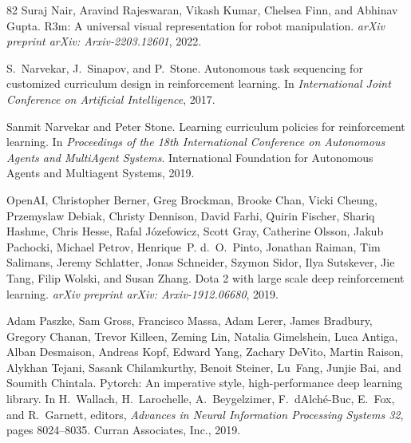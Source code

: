 \documentclass{article}
\begin{document}
\begin{thebibliography}{82}
Suraj Nair, Aravind Rajeswaran, Vikash Kumar, Chelsea Finn, and Abhinav Gupta.
\newblock R3m: A universal visual representation for robot manipulation.
\newblock \emph{arXiv preprint arXiv: Arxiv-2203.12601}, 2022.

S.~Narvekar, J.~Sinapov, and P.~Stone.
\newblock Autonomous task sequencing for customized curriculum design in reinforcement learning.
\newblock In \emph{International Joint Conference on Artificial Intelligence}, 2017.

Sanmit Narvekar and Peter Stone.
\newblock Learning curriculum policies for reinforcement learning.
\newblock In \emph{Proceedings of the 18th International Conference on Autonomous Agents and MultiAgent Systems}. International Foundation for Autonomous Agents and Multiagent Systems, 2019.

OpenAI, Christopher Berner, Greg Brockman, Brooke Chan, Vicki Cheung, Przemyslaw Debiak, Christy Dennison, David Farhi, Quirin Fischer, Shariq Hashme, Chris Hesse, Rafal Józefowicz, Scott Gray, Catherine Olsson, Jakub Pachocki, Michael Petrov, Henrique~P. d.~O.~Pinto, Jonathan Raiman, Tim Salimans, Jeremy Schlatter, Jonas Schneider, Szymon Sidor, Ilya Sutskever, Jie Tang, Filip Wolski, and Susan Zhang.
\newblock Dota 2 with large scale deep reinforcement learning.
\newblock \emph{arXiv preprint arXiv: Arxiv-1912.06680}, 2019.

Adam Paszke, Sam Gross, Francisco Massa, Adam Lerer, James Bradbury, Gregory Chanan, Trevor Killeen, Zeming Lin, Natalia Gimelshein, Luca Antiga, Alban Desmaison, Andreas Kopf, Edward Yang, Zachary DeVito, Martin Raison, Alykhan Tejani, Sasank Chilamkurthy, Benoit Steiner, Lu~Fang, Junjie Bai, and Soumith Chintala.
\newblock Pytorch: An imperative style, high-performance deep learning library.
\newblock In H.~Wallach, H.~Larochelle, A.~Beygelzimer, F.~d\textquotesingle Alch\'{e}-Buc, E.~Fox, and R.~Garnett, editors, \emph{Advances in Neural Information Processing Systems 32}, pages 8024--8035. Curran Associates, Inc., 2019.


\end{thebibliography}
\end{document}
